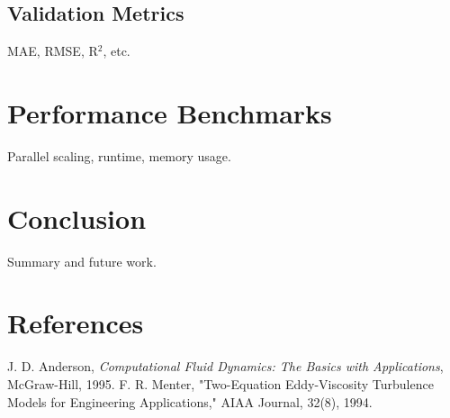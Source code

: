 \documentclass{article}
\begin{document}
\subsection{Validation Metrics}
MAE, RMSE, R$^2$, etc.
\section{Performance Benchmarks}
Parallel scaling, runtime, memory usage.
\section{Conclusion}
Summary and future work.
\section{References}
\begin{thebibliography}{9}
 J. D. Anderson, \emph{Computational Fluid Dynamics: The Basics with Applications}, McGraw-Hill, 1995.
 F. R. Menter, "Two-Equation Eddy-Viscosity Turbulence Models for Engineering Applications," AIAA Journal, 32(8), 1994.
\end{thebibliography}
\end{document}
